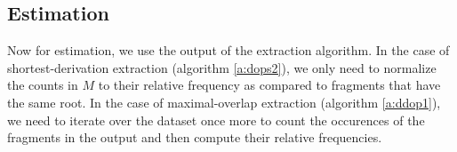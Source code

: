 \subsection{Estimation}
Now for estimation, we use the output of the extraction algorithm. In the case of shortest-derivation extraction (algorithm \ref{a:dops2}), we only need to normalize the counts in $M$ to their relative frequency as compared to fragments that have the same root. In the case of maximal-overlap extraction (algorithm \ref{a:ddop1}), we need to iterate over the dataset once more to count the occurences of the fragments in the output and then compute their relative frequencies.






